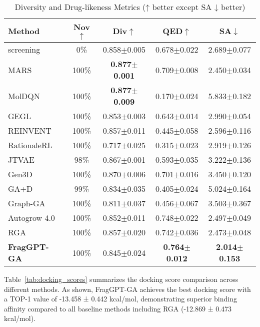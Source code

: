 \documentclass[lettersize,journal]{IEEEtran}
\begin{document}
\begin{table}[!t]
    \caption{Diversity and Drug-likeness Metrics (↑ better except SA ↓ better)}
    \label{tab:diversity_metrics}
    \centering    
    \small
    \setlength{\tabcolsep}{4pt}
    
    \begin{tabular}{l c c c c}
        \hline\hline
        Method & Nov$\uparrow$ & Div$\uparrow$ & QED$\uparrow$ & SA$\downarrow$ \\
        \hline
        screening & 0\% & 0.858$\pm$0.005 & 0.678$\pm$0.022 & 2.689$\pm$0.077 \\
        MARS & 100\% & \textbf{0.877}$\pm$\textbf{0.001} & 0.709$\pm$0.008 & 2.450$\pm$0.034 \\
            MolDQN & 100\% & \textbf{0.877}$\pm$\textbf{0.009} & 0.170$\pm$0.024 & 5.833$\pm$0.182 \\
        GEGL & 100\% & 0.853$\pm$0.003 & 0.643$\pm$0.014 & 2.990$\pm$0.054 \\
        REINVENT & 100\% & 0.857$\pm$0.011 & 0.445$\pm$0.058 & 2.596$\pm$0.116 \\
        RationaleRL & 100\% & 0.717$\pm$0.025 & 0.315$\pm$0.023 & 2.919$\pm$0.126 \\
        JTVAE & 98\% & 0.867$\pm$0.001 & 0.593$\pm$0.035 & 3.222$\pm$0.136 \\
        Gen3D & 100\% & 0.870$\pm$0.006 & 0.701$\pm$0.016 & 3.450$\pm$0.120 \\
        GA+D & 99\% & 0.834$\pm$0.035 & 0.405$\pm$0.024 & 5.024$\pm$0.164 \\
        Graph-GA & 100\% & 0.811$\pm$0.037 & 0.456$\pm$0.067 & 3.503$\pm$0.367 \\
        Autogrow 4.0 & 100\% & 0.852$\pm$0.011 & 0.748$\pm$0.022 & 2.497$\pm$0.049 \\
        RGA  & 100\% & 0.857$\pm$0.020 & 0.742$\pm$0.036 & 2.473$\pm$0.048 \\                 
        \hline
        \textbf{FragGPT-GA} & 100\% & 0.845$\pm$0.024 & \textbf{0.764$\pm$0.012} & \textbf{2.014$\pm$0.153} \\            
        \hline\hline
    \end{tabular}
\end{table}

Table~\ref{tab:docking_scores} summarizes the docking score comparison across different methods. As shown, FragGPT-GA achieves the best docking score with a TOP-1 value of -13.458 ± 0.442 kcal/mol, demonstrating superior binding affinity compared to all baseline methods including RGA (-12.869 ± 0.473 kcal/mol).
\end{document}
